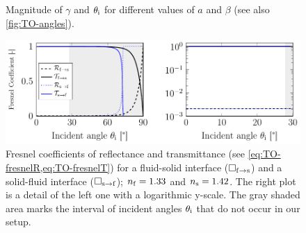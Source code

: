 \begin{figure}
\begin{subfigure}[b]{0.45\textwidth}
    \caption{}
    \label{fig:TO-theta_i}
  \end{subfigure}
    \caption{Magnitude of $\gamma$ and $\theta_{\mathrm{i}}$ for different values of $a$ 
    and $\beta$ (see also \cref{fig:TO-angles}).}
  \label{fig:TO-gamma_theta}
\end{figure}

\begin{figure}[tbp]
  \centering
  \includegraphics[]{Plots/cache/Fresnel.pdf}
  \caption{Fresnel coefficients of reflectance and transmittance (see 
    \cref{eq:TO-fresnelR,eq:TO-fresnelT}) for a fluid-solid interface 
    ($\Box_{\mathrm{f}\rightarrow\mathrm{s}}$) and a solid-fluid interface 
    ($\Box_{\mathrm{s}\rightarrow\mathrm{f}}$); $n_{\mathrm{f}}=1.33$ and $n_{\mathrm{s}}=1.42$. The right 
    plot is a detail of the left one with a logarithmic y-scale. The gray 
    shaded area marks the interval of incident angles $\theta_{\mathrm{i}}$ that do not 
  occur in our setup.}
  \label{fig:TO-fresnel}
\end{figure}

